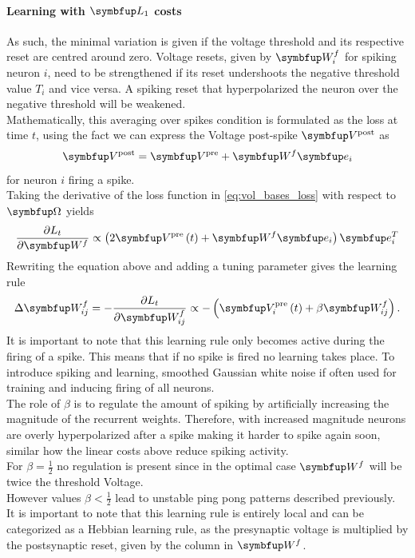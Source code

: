 \paragraph{Learning with $\bmu{L_1}$ costs}
As such, the minimal variation is given if the voltage threshold and its respective reset are centred around zero. Voltage resets, given by $\bmu{W}^f_i$ for spiking neuron $i$, need to be strengthened if its reset undershoots the negative threshold value $T_i$ and vice versa. A spiking reset that hyperpolarized the neuron over the negative threshold will be weakened.\\
Mathematically, this averaging over spikes condition is formulated as the loss at time $t$, using the fact we can express the Voltage post-spike $\bmu{V}^{\text {post}}$ as
\begin{equation}
	\bmu{V}^{\text {post}} = \bmu{V}^{\text {pre}} + \bmu{W}^f \bmu{e}_i
\end{equation}
for neuron $i$ firing a spike.\\
Taking the derivative of the loss function in \cref{eq:vol_bases_loss} with respect to $\bmu{\Omega}$ yields
\begin{equation}
\frac{\partial L_t}{\partial \bmu{W}^f} \propto\left(2 \bmu{V}^{\text {pre}}\left(t\right)+\bmu{W}^f \bmu{e}_{i}\right) \bmu{e}_{i}^{T}
\end{equation}
Rewriting the equation above and adding a tuning parameter gives the learning rule
\begin{equation}\label{eq:Wf_learning_rule_1}
	\Delta \bmu{W}^f_{ij} =-\frac{\partial L_t}{\partial \bmu{W}^f_{ij}} \propto - \left( \bmu{V}_i^{\text {pre}}\left(t\right)+\beta \bmu{W}^f_{ij}\right).
\end{equation}
It is important to note that this learning rule only becomes active during the firing of a spike. This means that if no spike is fired no learning takes place. To introduce spiking and learning, smoothed  Gaussian white noise if often used for training and inducing firing of all neurons.\\
The role of $\beta$ is to regulate the amount of spiking by artificially increasing the magnitude of the recurrent weights. Therefore, with increased magnitude neurons are overly hyperpolarized after a spike making it harder to spike again soon, similar how the linear costs above reduce spiking activity.\\
For $\beta = \frac{1}{2}$ no regulation is present since in the optimal case  $\bmu{W}^f$ will be twice the threshold Voltage.\\
However values $\beta<\frac{1}{2}$ lead to unstable ping pong patterns described previously.\\
It is important to note that this learning rule is entirely local and can be categorized as a Hebbian learning rule, as the presynaptic voltage is multiplied by the postsynaptic reset, given by the column in $\bmu{W}^f$.\\
